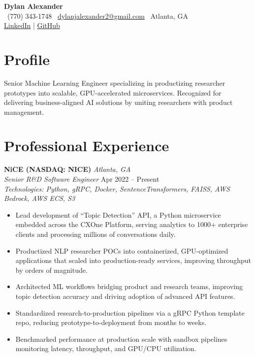 \documentclass[a4paper,10pt]{article}
\begin{document}
\begin{center}
    {\LARGE \textbf{Dylan Alexander}} \\
    \vspace{3pt}
    \faPhone\ (770) 343-1748 \quad
    \faEnvelope\ \href{mailto:dylanjalexander2@gmail.com}{dylanjalexander2@gmail.com} \quad
    \faMapMarker*\ Atlanta, GA \\
    \vspace{3pt}
    \href{https://linkedin.com}{LinkedIn} \quad | \quad
    \href{https://github.com}{GitHub}
\end{center}

\section*{Profile}
Senior Machine Learning Engineer specializing in productizing researcher prototypes into scalable, GPU-accelerated microservices. Recognized for delivering business-aligned AI solutions by uniting researchers with product management.

\section*{Professional Experience}

\textbf{NiCE (NASDAQ: NICE)} \hfill \textit{Atlanta, GA} \\
\textit{Senior R\&D Software Engineer} \hfill Apr 2022 -- Present \\
\textit{Technologies: Python, gRPC, Docker, SentenceTransformers, FAISS, AWS Bedrock, AWS ECS, S3}
\begin{itemize}[leftmargin=*]
    \item Lead development of “Topic Detection” API, a Python microservice embedded across the CXOne Platform, serving analytics to 1000+ enterprise clients and processing millions of conversations daily.
    \item Productized NLP researcher POCs into containerized, GPU-optimized applications that scaled into production-ready services, improving throughput by orders of magnitude.
    \item Architected ML workflows bridging product and research teams, improving topic detection accuracy and driving adoption of advanced API features.
    \item Standardized research-to-production pipelines via a gRPC Python template repo, reducing prototype-to-deployment from months to weeks.
    \item Benchmarked performance at production scale with sandbox pipelines monitoring latency, throughput, and GPU/CPU utilization.
\end{itemize}
\end{document}
